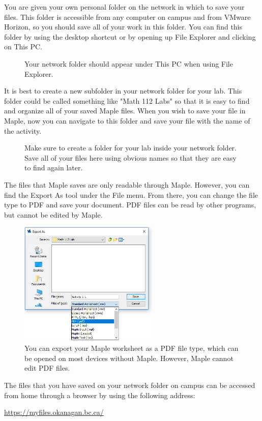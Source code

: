 You are given your own personal folder on the network in which to save your files. This folder is accessible from any computer on campus and from VMware Horizon, so you should save all of your work in this folder. You can find this folder by using the desktop shortcut or by opening up File Explorer and clicking on This PC.

\begin{figure}
\centering
{}
\caption{Your network folder should appear under This PC when using File Explorer.}
\end{figure}

\clearpage

It is best to create a new subfolder in your network folder for your lab. This folder could be called something like "Math 112 Labs" so that it is easy to find and organize all of your saved Maple files. When you wish to save your file in Maple, now you can navigate to this folder and save your file with the name of the activity.

\begin{figure}
\centering
{}
\caption{Make sure to create a folder for your lab inside your network folder. Save all of your files here using obvious names so that they are easy to find again later.}
\end{figure}

The files that Maple saves are only readable through Maple. However, you can find the Export As tool under the File menu. From there, you can change the file type to PDF and save your document. PDF files can be read by other programs, but cannot be edited by Maple.

\begin{figure}
\centering
{}
\includegraphics[width=0.6\textwidth]{introduction/figures/exportpdf.png}
\caption{You can export your Maple worksheet as a PDF file type, which can be opened on most devices without Maple. However, Maple cannot edit PDF files.}
\end{figure}

The files that you have saved on your network folder on campus can be accessed from home through a browser by using the following address:

\begin{center}
    \url{https://myfiles.okanagan.bc.ca/}
\end{center}